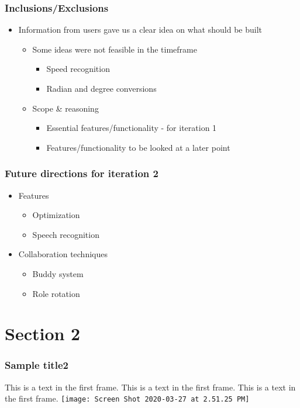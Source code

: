 \documentclass{beamer}
\begin{document}
\begin{frame}
\frametitle{Inclusions/Exclusions}
\begin{itemize}
\item Information from users gave us a clear idea on what should be built
\begin{itemize}
\item Some ideas were not feasible in the timeframe
\begin{itemize}
\item Speed recognition
\item Radian and degree conversions
\end{itemize}
\item Scope \& reasoning
\begin{itemize}
\item Essential features/functionality - for iteration 1
\item Features/functionality to be looked at a later point
\end{itemize}
\end{itemize}
\end{itemize}
\end{frame}
\begin{frame}
\frametitle{Future directions for iteration 2}
\begin{itemize}
\item Features
\begin{itemize}
\item Optimization
\item Speech recognition
\end{itemize}
\item Collaboration techniques
\begin{itemize}
\item Buddy system
\item Role rotation
\end{itemize}
\end{itemize}
\end{frame}
\section{Section 2}
\begin{frame}
\frametitle{Sample title2}
This is a text in the first frame. This is a text in the first frame. This is a text in the first frame.
\texttt{[image: Screen Shot 2020-03-27 at 2.51.25 PM]}
\end{frame}
\end{document}
